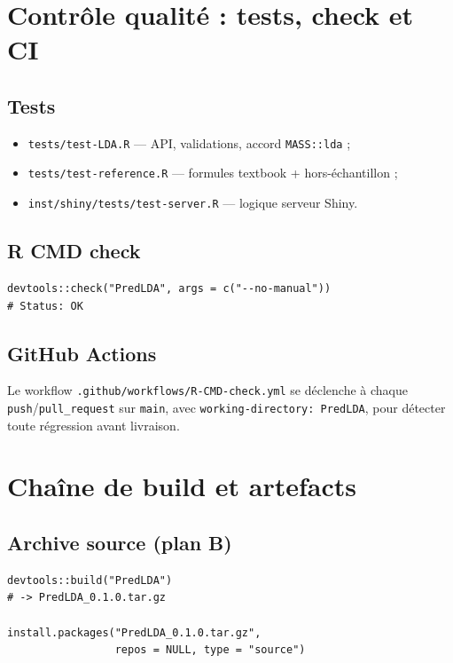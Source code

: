 \documentclass[11pt,a4paper]{article}
\begin{document}
\section{Contr\^ole qualit\'e : tests, check et CI}

\subsection{Tests}

\begin{itemize}[leftmargin=*]
  \item \texttt{tests/test-LDA.R} --- API, validations, accord \texttt{MASS::lda} ;
  \item \texttt{tests/test-reference.R} --- formules textbook + hors-\'echantillon ;
  \item \texttt{inst/shiny/tests/test-server.R} --- logique serveur Shiny.
\end{itemize}

\subsection{R CMD check}

\begin{lstlisting}
devtools::check("PredLDA", args = c("--no-manual"))
# Status: OK
\end{lstlisting}

\subsection{GitHub Actions}

Le workflow \texttt{.github/workflows/R-CMD-check.yml} se d\'eclenche \`a chaque
\texttt{push}/\texttt{pull\_request} sur \texttt{main}, avec
\texttt{working-directory: PredLDA}, pour d\'etecter toute r\'egression avant
livraison.

\section{Cha\^ine de build et artefacts}

\subsection{Archive source (plan B)}

\begin{lstlisting}
devtools::build("PredLDA")
# -> PredLDA_0.1.0.tar.gz

install.packages("PredLDA_0.1.0.tar.gz",
                 repos = NULL, type = "source")
\end{lstlisting}
\end{document}

